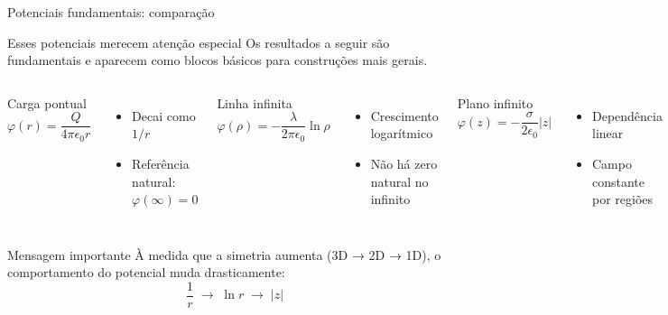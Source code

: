 \documentclass[aspectratio=169,11pt]{beamer}
\begin{document}
\begin{frame}{Potenciais fundamentais: comparação}

\begin{alertblock}{Esses potenciais merecem atenção especial}
Os resultados a seguir são fundamentais e aparecem como blocos básicos para construções mais gerais.
\end{alertblock}

\vspace{0.3cm}

\begin{columns}[T,onlytextwidth]

\begin{mybox}{Carga pontual}
\begin{equation}
\varphi(r) = \frac{Q}{4\pi \epsilon_0 r}
\tag{3.41}
\end{equation}
\end{mybox}

\begin{itemize}
\item Decai como \(1/r\)
\item Referência natural: \(\varphi(\infty)=0\)
\end{itemize}

\begin{mybox}{Linha infinita}
\begin{equation}
\varphi(\rho) = -\frac{\lambda}{2\pi \epsilon_0}\ln \rho
\tag{3.43}
\end{equation}
\end{mybox}

\begin{itemize}
\item Crescimento logarítmico
\item Não há zero natural no infinito
\end{itemize}

\begin{mybox}{Plano infinito}
\begin{equation}
\varphi(z) = -\frac{\sigma}{2\epsilon_0}|z|
\tag{3.45}
\end{equation}
\end{mybox}

\begin{itemize}
\item Dependência linear
\item Campo constante por regiões
\end{itemize}

\end{columns}

\vspace{0.4cm}

\begin{alertblock}{Mensagem importante}
À medida que a simetria aumenta (3D → 2D → 1D), o comportamento do potencial muda drasticamente:
\[
\frac{1}{r} \;\longrightarrow\; \ln r \;\longrightarrow\; |z|
\]
\end{alertblock}

\end{frame}
\end{document}
